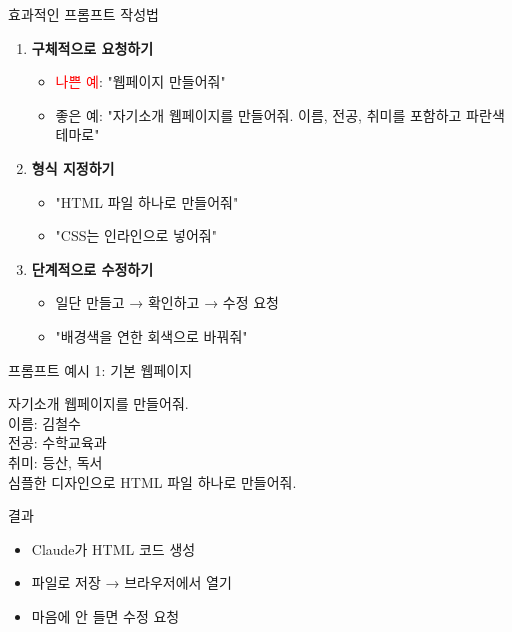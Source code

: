 \documentclass[aspectratio=169]{beamer}
\begin{document}
\begin{frame}{효과적인 프롬프트 작성법}
  \begin{enumerate}
    \item \textbf{구체적으로 요청하기}
    \begin{itemize}
      \item \textcolor{red}{나쁜 예}: "웹페이지 만들어줘"
      \item \textcolor{green!60!black}{좋은 예}: "자기소개 웹페이지를 만들어줘. 이름, 전공, 취미를 포함하고 파란색 테마로"
    \end{itemize}
    
    \item \textbf{형식 지정하기}
    \begin{itemize}
      \item "HTML 파일 하나로 만들어줘"
      \item "CSS는 인라인으로 넣어줘"
    \end{itemize}
    
    \item \textbf{단계적으로 수정하기}
    \begin{itemize}
      \item 일단 만들고 → 확인하고 → 수정 요청
      \item "배경색을 연한 회색으로 바꿔줘"
    \end{itemize}
  \end{enumerate}
\end{frame}

\begin{frame}[fragile]{프롬프트 예시 1: 기본 웹페이지}
  \begin{tcolorbox}[title=프롬프트 예시]
    \small\ttfamily
    자기소개 웹페이지를 만들어줘.\\[0.3em]
    이름: 김철수\\
    전공: 수학교육과\\
    취미: 등산, 독서\\[0.3em]
    심플한 디자인으로 HTML 파일 하나로 만들어줘.
  \end{tcolorbox}
  
  \vspace{0.5em}
  
  \begin{block}{결과}
    \begin{itemize}
      \item Claude가 HTML 코드 생성
      \item 파일로 저장 → 브라우저에서 열기
      \item 마음에 안 들면 수정 요청
    \end{itemize}
  \end{block}
\end{frame}
\end{document}
